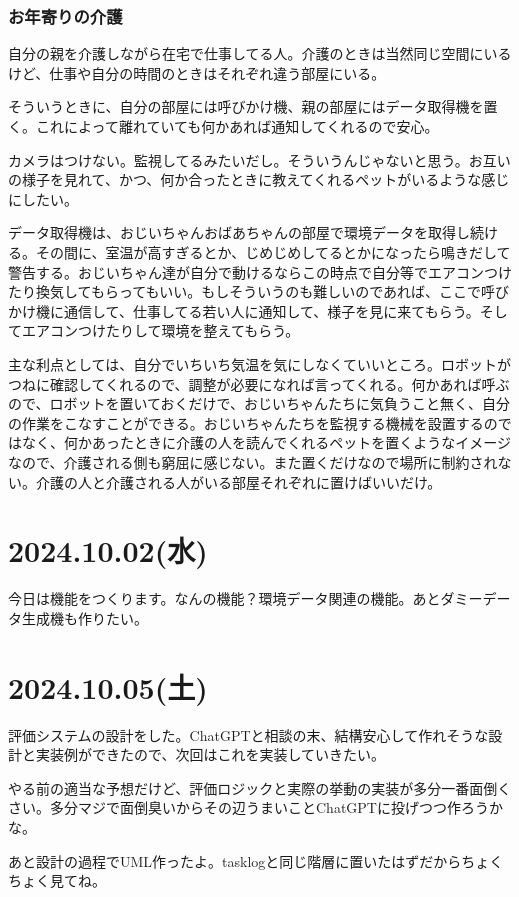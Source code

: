 \documentclass[twocolumn]{mynote}
\begin{document}
\subsubsection*{お年寄りの介護}
自分の親を介護しながら在宅で仕事してる人。介護のときは当然同じ空間にいるけど、仕事や自分の時間のときはそれぞれ違う部屋にいる。

そういうときに、自分の部屋には呼びかけ機、親の部屋にはデータ取得機を置く。これによって離れていても何かあれば通知してくれるので安心。

カメラはつけない。監視してるみたいだし。そういうんじゃないと思う。お互いの様子を見れて、かつ、何か合ったときに教えてくれるペットがいるような感じにしたい。

データ取得機は、おじいちゃんおばあちゃんの部屋で環境データを取得し続ける。その間に、室温が高すぎるとか、じめじめしてるとかになったら鳴きだして警告する。おじいちゃん達が自分で動けるならこの時点で自分等でエアコンつけたり換気してもらってもいい。もしそういうのも難しいのであれば、ここで呼びかけ機に通信して、仕事してる若い人に通知して、様子を見に来てもらう。そしてエアコンつけたりして環境を整えてもらう。

主な利点としては、自分でいちいち気温を気にしなくていいところ。ロボットがつねに確認してくれるので、調整が必要になれば言ってくれる。何かあれば呼ぶので、ロボットを置いておくだけで、おじいちゃんたちに気負うこと無く、自分の作業をこなすことができる。おじいちゃんたちを監視する機械を設置するのではなく、何かあったときに介護の人を読んでくれるペットを置くようなイメージなので、介護される側も窮屈に感じない。また置くだけなので場所に制約されない。介護の人と介護される人がいる部屋それぞれに置けばいいだけ。

\section*{2024.10.02(水)}
今日は機能をつくります。なんの機能？環境データ関連の機能。あとダミーデータ生成機も作りたい。

\section*{2024.10.05(土)}
評価システムの設計をした。ChatGPTと相談の末、結構安心して作れそうな設計と実装例ができたので、次回はこれを実装していきたい。

やる前の適当な予想だけど、評価ロジックと実際の挙動の実装が多分一番面倒くさい。多分マジで面倒臭いからその辺うまいことChatGPTに投げつつ作ろうかな。

あと設計の過程でUML作ったよ。tasklogと同じ階層に置いたはずだからちょくちょく見てね。
\end{document}
